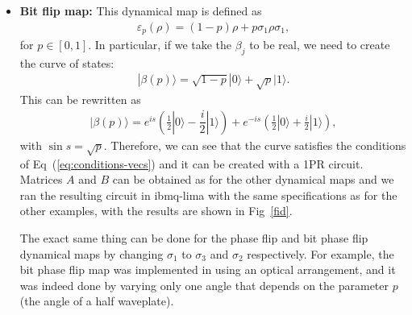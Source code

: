 \documentclass[10pt,letterpaper]{article} %
\newcommand{\fref}[1]{Fig~\ref{#1}}
\newcommand{\eref}[1]{Eq~(\ref{#1})}
\begin{document}
\begin{itemize}
\item \textbf{Bit flip map:} 
This dynamical map is defined as
\begin{align*}
\varepsilon_p(\rho) = (1-p)\rho + p\sigma_1 \rho \sigma_1,
\end{align*}
for $p \in [0,1]$. 
In particular, if we take the $\beta_j$ to be real,
we need to create the curve of states:
\begin{align*}
|\beta(p)\rangle = \sqrt{1-p} |0\rangle +\sqrt{p} |1\rangle.
\end{align*}
This can be rewritten as
\begin{align*}
|\beta(p) \rangle = e^{is}  \left(\frac{1}{2} |0\rangle - \dfrac{i}{2} |1\rangle \right) + e^{-is} \left( \frac{1}{2} |0\rangle + \frac{i}{2} |1\rangle \right),
\end{align*}
with $\sin s= \sqrt{p}$.
Therefore, we can see that the curve satisfies the conditions of  \eref{eq:conditions-vecs} 
and it can be created with a 1PR circuit.
Matrices $A$ and $B$ can be obtained as for the other
dynamical maps and we ran the resulting circuit in ibmq-lima with the same
specifications as for the other examples,
with the results are shown in \fref{fid}.

The exact same thing can be done
for the phase flip and bit phase flip dynamical maps by
changing $\sigma_1$ to
$\sigma_3$ and $\sigma_2$ respectively.
For example, the bit phase flip map was implemented in \cite{Andrea, Andrea_4qb} 
using an optical arrangement, and  it was indeed done 
by varying only one angle that depends on the parameter $p$ (the angle of a
half waveplate). 


\end{itemize}
\end{document}

